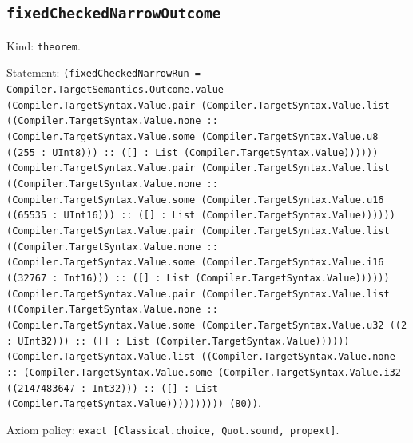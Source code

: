 \documentclass[11pt]{article}
\begin{document}
\subsection*{\texttt{fixedCheckedNarrowOutcome}}
\noindent Kind: \texttt{theorem}.\par
\noindent Statement: \texttt{(fixedCheckedNarrowRun = Compiler.TargetSemantics.Outcome.value (Compiler.TargetSyntax.Value.pair (Compiler.TargetSyntax.Value.list ((Compiler.TargetSyntax.Value.none :: (Compiler.TargetSyntax.Value.some (Compiler.TargetSyntax.Value.u8 ((255 : UInt8))) :: ([] : List (Compiler.TargetSyntax.Value)))))) (Compiler.TargetSyntax.Value.pair (Compiler.TargetSyntax.Value.list ((Compiler.TargetSyntax.Value.none :: (Compiler.TargetSyntax.Value.some (Compiler.TargetSyntax.Value.u16 ((65535 : UInt16))) :: ([] : List (Compiler.TargetSyntax.Value)))))) (Compiler.TargetSyntax.Value.pair (Compiler.TargetSyntax.Value.list ((Compiler.TargetSyntax.Value.none :: (Compiler.TargetSyntax.Value.some (Compiler.TargetSyntax.Value.i16 ((32767 : Int16))) :: ([] : List (Compiler.TargetSyntax.Value)))))) (Compiler.TargetSyntax.Value.pair (Compiler.TargetSyntax.Value.list ((Compiler.TargetSyntax.Value.none :: (Compiler.TargetSyntax.Value.some (Compiler.TargetSyntax.Value.u32 ((2 : UInt32))) :: ([] : List (Compiler.TargetSyntax.Value)))))) (Compiler.TargetSyntax.Value.list ((Compiler.TargetSyntax.Value.none :: (Compiler.TargetSyntax.Value.some (Compiler.TargetSyntax.Value.i32 ((2147483647 : Int32))) :: ([] : List (Compiler.TargetSyntax.Value)))))))))) (80))}.\par
\noindent Axiom policy: \texttt{exact [Classical.choice, Quot.sound, propext]}.\par
\end{document}
